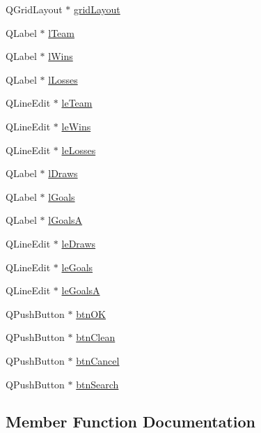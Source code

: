 \begin{DoxyCompactItemize}
\item 
Q\+Grid\+Layout $\ast$ \hyperlink{class_ui___dialog_a41336d41594e8776a81d095e8e4ffc61}{grid\+Layout}
\item 
Q\+Label $\ast$ \hyperlink{class_ui___dialog_a4419be090ba293f0442cce11fefde939}{l\+Team}
\item 
Q\+Label $\ast$ \hyperlink{class_ui___dialog_a33a17f4fc1e7dde797d5cce1d08f4843}{l\+Wins}
\item 
Q\+Label $\ast$ \hyperlink{class_ui___dialog_a3562c3fc6bcff7beb1d9bf6302760f87}{l\+Losses}
\item 
Q\+Line\+Edit $\ast$ \hyperlink{class_ui___dialog_a3be40225f286cfb11e01a180ed40e1fc}{le\+Team}
\item 
Q\+Line\+Edit $\ast$ \hyperlink{class_ui___dialog_a7f3b4fab638a423dd8f2c04842fb7b8b}{le\+Wins}
\item 
Q\+Line\+Edit $\ast$ \hyperlink{class_ui___dialog_a6598d0ce4fee8652cd9a8456de1c0ebe}{le\+Losses}
\item 
Q\+Label $\ast$ \hyperlink{class_ui___dialog_a7bd37147765f438a8c23dbc8e7b0fd3a}{l\+Draws}
\item 
Q\+Label $\ast$ \hyperlink{class_ui___dialog_aaec0030aedf724c298c9ae002df6b9c5}{l\+Goals}
\item 
Q\+Label $\ast$ \hyperlink{class_ui___dialog_afb796c00602fbfb12d969d217dbd9d26}{l\+Goals\+A}
\item 
Q\+Line\+Edit $\ast$ \hyperlink{class_ui___dialog_a884e7aabd14cfbaeb49a967e16dae6cc}{le\+Draws}
\item 
Q\+Line\+Edit $\ast$ \hyperlink{class_ui___dialog_aa57700d2b5361fec01d869b72711a933}{le\+Goals}
\item 
Q\+Line\+Edit $\ast$ \hyperlink{class_ui___dialog_a0bbec6c46dabbb4ad8a3269780bbe238}{le\+Goals\+A}
\item 
Q\+Push\+Button $\ast$ \hyperlink{class_ui___dialog_a5f133d5ef9206bb1d4dfd8f8c82a8163}{btn\+O\+K}
\item 
Q\+Push\+Button $\ast$ \hyperlink{class_ui___dialog_adcea696e7dfb639f1b3e15cc828832aa}{btn\+Clean}
\item 
Q\+Push\+Button $\ast$ \hyperlink{class_ui___dialog_a86e97ef07dc3416e5011fc86f69b4bcf}{btn\+Cancel}
\item 
Q\+Push\+Button $\ast$ \hyperlink{class_ui___dialog_a935d4a9c4699e920003ea53ab33b2c4d}{btn\+Search}
\end{DoxyCompactItemize}


\subsection{Member Function Documentation}
\hypertarget{class_ui___dialog_afa0ccb6f716ca6178260522a193c250e}{}
